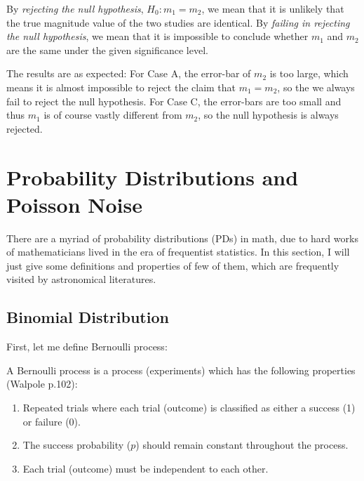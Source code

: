 By \textit{rejecting the null hypothesis}, $ H_0: m_1 = m_2 $, we mean that it is unlikely that the true magnitude value of the two studies are identical. By \textit{failing in rejecting the null hypothesis}, we mean that it is impossible to conclude whether $ m_1 $ and $ m_2 $ are the same under the given significance level. 

The results are as expected: For Case A, the error-bar of $ m_2 $ is too large, which means it is almost impossible to reject the claim that $ m_1 = m_2 $, so the we always fail to reject the null hypothesis. For Case C, the error-bars are too small and thus $ m_1 $ is of course vastly different from $ m_2 $, so the null hypothesis is always rejected.





\section{Probability Distributions and Poisson Noise}
There are a myriad of probability distributions (PDs) in math, due to hard works of mathematicians lived in the era of frequentist statistics. In this section, I will just give some definitions and properties of few of them, which are frequently visited by astronomical literatures.

\subsection{Binomial Distribution}
First, let me define Bernoulli process:
\begin{defn}
A Bernoulli process is a process (experiments) which has the following properties (Walpole p.102):\newpage
\begin{enumerate}
  \item Repeated trials where each trial (outcome) is classified as either a success (1) or failure (0).
  \item The success probability ($ p $) should remain constant throughout the process.
  \item Each trial (outcome) must be independent to each other.
\end{enumerate}
\end{defn}

